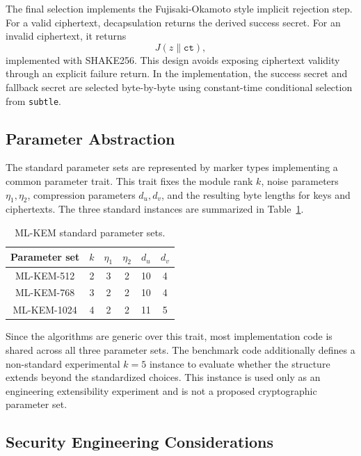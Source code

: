 The final selection implements the Fujisaki-Okamoto style implicit rejection step. For a valid ciphertext, decapsulation returns the derived success secret. For an invalid ciphertext, it returns
$$
J(z \parallel \texttt{ct}),
$$
implemented with SHAKE256. This design avoids exposing ciphertext validity through an explicit failure return. In the implementation, the success secret and fallback secret are selected byte-by-byte using constant-time conditional selection from \texttt{subtle}.

\subsection{Parameter Abstraction}

The standard parameter sets are represented by marker types implementing a common parameter trait. This trait fixes the module rank $k$, noise parameters $\eta_1,\eta_2$, compression parameters $d_u,d_v$, and the resulting byte lengths for keys and ciphertexts. The three standard instances are summarized in Table~\ref{tab:ml-kem-parameters}.

\begin{table}[htbp]
    \centering
    \caption{ML-KEM standard parameter sets.}
    \label{tab:ml-kem-parameters}
    \begin{tabular}{c c c c c c}
        \toprule
        \textbf{Parameter set} & \textbf{$k$} & \textbf{$\eta_1$} & \textbf{$\eta_2$} & \textbf{$d_u$} & \textbf{$d_v$} \\
        \midrule
        ML-KEM-512  & 2 & 3 & 2 & 10 & 4 \\
        ML-KEM-768  & 3 & 2 & 2 & 10 & 4 \\
        ML-KEM-1024 & 4 & 2 & 2 & 11 & 5 \\
        \bottomrule
    \end{tabular}
\end{table}

Since the algorithms are generic over this trait, most implementation code is shared across all three parameter sets. The benchmark code additionally defines a non-standard experimental $k=5$ instance to evaluate whether the structure extends beyond the standardized choices. This instance is used only as an engineering extensibility experiment and is not a proposed cryptographic parameter set.

\subsection{Security Engineering Considerations}

